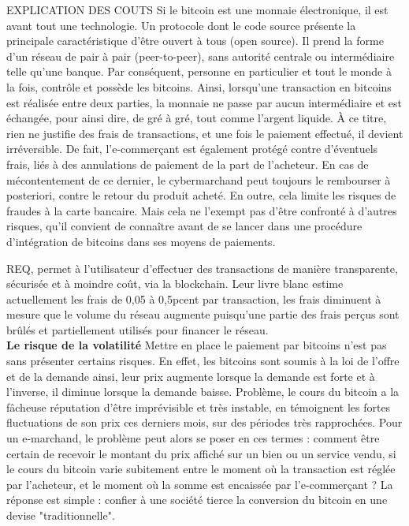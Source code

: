 \documentclass[12pt]{report}
\begin{document}
EXPLICATION DES COUTS 
Si le bitcoin est une monnaie électronique, il est avant tout une technologie. Un protocole dont le code source présente la principale caractéristique d'être ouvert à tous (open source). Il prend la forme d'un réseau de pair à pair (peer-to-peer), sans autorité centrale ou intermédiaire telle qu'une banque. Par conséquent, personne en particulier et tout le monde à la fois, contrôle et possède les bitcoins. Ainsi, lorsqu'une transaction en bitcoins est réalisée entre deux parties, la monnaie ne passe par aucun intermédiaire et est échangée, pour ainsi dire, de gré à gré, tout comme l'argent liquide. À ce titre, rien ne justifie des frais de transactions, et une fois le paiement effectué, il devient irréversible. De fait, l'e-commerçant est également protégé contre d'éventuels frais, liés à des annulations de paiement de la part de l'acheteur. En cas de mécontentement de ce dernier, le cybermarchand peut toujours le rembourser à posteriori, contre le retour du produit acheté. En outre, cela limite les risques de fraudes à la carte bancaire. Mais cela ne l'exempt pas d'être confronté à d'autres risques, qu'il convient de connaître avant de se lancer dans une procédure d'intégration de bitcoins dans ses moyens de paiements.

REQ, permet à l’utilisateur d’effectuer des transactions de manière transparente, sécurisée et à moindre coût, via la blockchain. Leur livre blanc estime actuellement les frais de 0,05 à 0,5pcent par transaction, les frais diminuent à mesure que le volume du réseau augmente puisqu’une partie des frais perçus sont brûlés et partiellement utilisés pour financer le réseau.\\

\textbf{Le risque de la volatilité}
Mettre en place le paiement par bitcoins n'est pas sans présenter certains risques. En effet, les bitcoins sont soumis à la loi de l'offre et de la demande ainsi, leur prix augmente lorsque la demande est forte et à l'inverse, il diminue lorsque la demande baisse. Problème, le cours du bitcoin a la fâcheuse réputation d'être imprévisible et très instable, en témoignent les fortes fluctuations de son prix ces derniers mois, sur des périodes très rapprochées. Pour un e-marchand, le problème peut alors se poser en ces termes : comment être certain de recevoir le montant du prix affiché sur un bien ou un service vendu, si le cours du bitcoin varie subitement entre le moment où la transaction est réglée par l'acheteur, et le moment où la somme est encaissée par l'e-commerçant ? La réponse est simple : confier à une société tierce la conversion du bitcoin en une devise "traditionnelle".
\end{document}
